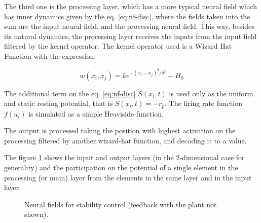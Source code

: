 \documentclass{sig-alternate}
\begin{document}
The third one is the processing layer, which has a more typical neural
field which has inner dynamics given by the eq. \ref{eq:nf-disc},
where the fields taken into the sum are the input neural field, and
the processing neural field. This way, besides its natural dynamics,
the processing layer receives the inputs from the input field filtered
by the kernel operator. The kernel operator used is a Wizard Hat
Function with the expression:

\begin{equation}
  w(x_i,x_j)=ke^{-(x_i-x_j)^2/\delta^2}-H_0
\end{equation}

The additional term on the eq. \ref{eq:nf-disc} $S(x_i,t)$ is used
only as the uniform and static resting potential, that is
$S(x_i,t)=-r_p$.  The firing rate function $f(u_i)$ is simulated as a
simple Heaviside function.

The output is processed taking the position with highest activation on
the processing filtered by another wizard-hat function, and decoding
it to a value.

The figure \ref{fig:nf-controller} shows the input and output layers
(in the 2-dimensional case for generality) and the participation on
the potential of a single element in the processing (or main) layer
from the elements in the same layer and in the input layer.


\begin{figure}[t]
  \label{fig:nf-controller}
  \centering
  \caption{Neural fields for stability control (feedback with the
    plant not shown).}
\end{figure}




\end{document}
